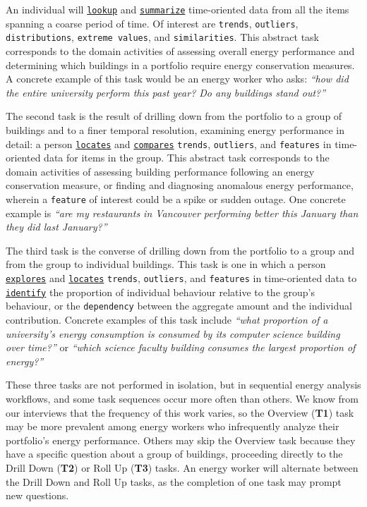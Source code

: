 \documentclass[journal]{vgtc}                %
\newcommand{\bstart}[1]{\vspace{1mm} \noindent{\textbf{#1:}}}
\begin{document}
\bstart{T1 / Overview} An individual will \underline{{\tt lookup}} and \underline{{\tt summarize}} time-oriented data from all the items spanning a coarse period of time. 
Of interest are {\tt trends}, {\tt outliers}, {\tt distributions}, {\tt extreme values}, and {\tt similarities}. 
This abstract task corresponds to the domain activities of assessing overall energy performance and determining which buildings in a portfolio require energy conservation measures. 
A concrete example of this task would be an energy worker who asks: {\it ``how did the entire university perform this past year? Do any buildings stand out?''}

\bstart{T2 / Drill Down} The second task is the result of drilling down from the portfolio to a group of buildings and to a finer temporal resolution, examining energy performance in detail: a person \underline{{\tt locates}} and \underline{{\tt compares}} {\tt trends}, {\tt outliers}, and {\tt features} in time-oriented data for items in the group.
This abstract task corresponds to the domain activities of assessing building performance following an energy conservation measure, or finding and diagnosing anomalous energy performance, wherein a {\tt feature} of interest could be a spike or sudden outage.
One concrete example is {\it ``are my restaurants in Vancouver performing better this January than they did last January?''}

\bstart{T3 / Roll Up} The third task is the converse of drilling down from the portfolio to a group and from the group to individual buildings.
This task is one in which a person \underline{{\tt explores}} and \underline{{\tt locates}} {\tt trends}, {\tt outliers}, and {\tt features} in time-oriented data to \underline{{\tt identify}} the proportion of individual behaviour relative to the group's behaviour, or the {\tt dependency} between the aggregate amount and the individual contribution.
Concrete examples of this task include {\it ``what proportion of a university's energy consumption is consumed by its computer science building over time?''} or {\it ``which science faculty building consumes the largest proportion of energy?''}

\bstart{Task sequences} These three tasks are not performed in isolation, but in sequential energy analysis workflows, and some task sequences occur more often than others. 
We know from our interviews that the frequency of this work varies, so the Overview ({\bf T1}) task may be more prevalent among energy workers who infrequently analyze their portfolio's energy performance.
Others may skip the Overview task because they have a specific question about a group of buildings, proceeding directly to the Drill Down ({\bf T2}) or Roll Up ({\bf T3}) tasks. 
An energy worker will alternate between the Drill Down and Roll Up tasks, as the completion of one task may prompt new questions.
\end{document}

